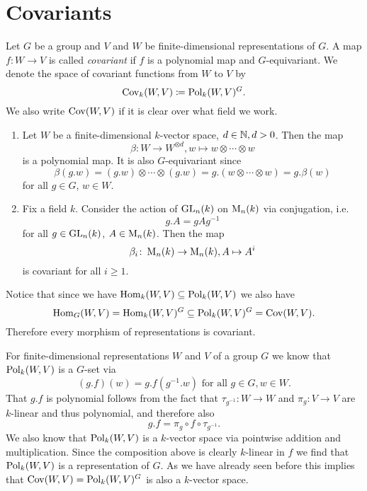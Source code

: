 \section{Covariants}


\begin{defi}
  Let $G$ be a group and $V$ and $W$ be finite-dimensional representations of $G$.
  A map $f \colon W \to V$ is called \emph{covariant} if $f$ is a polynomial map and $G$-equivariant.
  We denote the space of covariant functions from $W$ to $V$ by
  \[
              \operatorname{Cov}_k(W,V)
    \coloneqq \operatorname{Pol}_k(W,V)^G.
  \]
  We also write $\operatorname{Cov}(W,V)$ if it is clear over what field we work.
\end{defi}


\begin{expls}
  \begin{enumerate}[label=\emph{\alph*)},leftmargin=*]
    \item
      Let $W$ be a finite-dimensional $k$-vector space, $d \in \mathbb{N}, d > 0$.
      Then the map
      \[
                \beta
        \colon  W \to W^{\otimes d},
                w
        \mapsto w \otimes \dotsb \otimes w
      \]
      is a polynomial map.
      It is also $G$-equivariant since
      \[
          \beta(g.w)
        = (g.w) \otimes \dotsb \otimes (g.w)
        = g.(w \otimes \dotsb \otimes w)
        = g.\beta(w)
      \]
      for all $g \in G$, $w \in W$.
    \item
      Fix a field $k$.
      Consider the action of $\operatorname{GL}_n(k)$ on $\operatorname{M}_n(k)$ via conjugation, i.e.\
      \[
          g.A
        = gAg^{-1}
      \]
      for all $g \in \operatorname{GL}_n(k)$, $A \in \operatorname{M}_n(k)$.
      Then the map
      \[
                \beta_i 
        \colon  \operatorname{M}_n(k) 
        \to     \operatorname{M}_n(k),
                A
        \mapsto A^i
      \]
      is covariant for all $i \geq 1$. 
  \end{enumerate}
\end{expls}


Notice that since we have $\operatorname{Hom}_k(W,V) \subseteq \operatorname{Pol}_k(W,V)$ we also have
\[
            \operatorname{Hom}_G(W,V)
  =         \operatorname{Hom}_k(W,V)^G
  \subseteq \operatorname{Pol}_k(W,V)^G
  =         \operatorname{Cov}(W,V).
\]
Therefore every morphism of representations is covariant.


For finite-dimensional representations $W$ and $V$ of a group $G$ we know that $\operatorname{Pol}_k(W,V)$ is a $G$-set via
\[
    (g.f)(w)
  = g.f\left( g^{-1}.w \right)
  \text{ for all }
  g \in G,
  w \in W.
\]
That $g.f$ is polynomial follows from the fact that $\tau_{g^{-1}} \colon W \to W$ and $\pi_g \colon V \to V$ are $k$-linear and thus polynomial, and therefore also
\[
    g.f
  = \pi_g \circ f \circ \tau_{g^{-1}}.
\]
We also know that $\operatorname{Pol}_k(W,V)$ is a $k$-vector space via pointwise addition and multiplication.
Since the composition above is clearly $k$-linear in $f$ we find that $\operatorname{Pol}_k(W,V)$ is a representation of $G$.
As we have already seen before this implies that $\operatorname{Cov}(W,V) = \operatorname{Pol}_k(W,V)^G$ is also a $k$-vector space.


